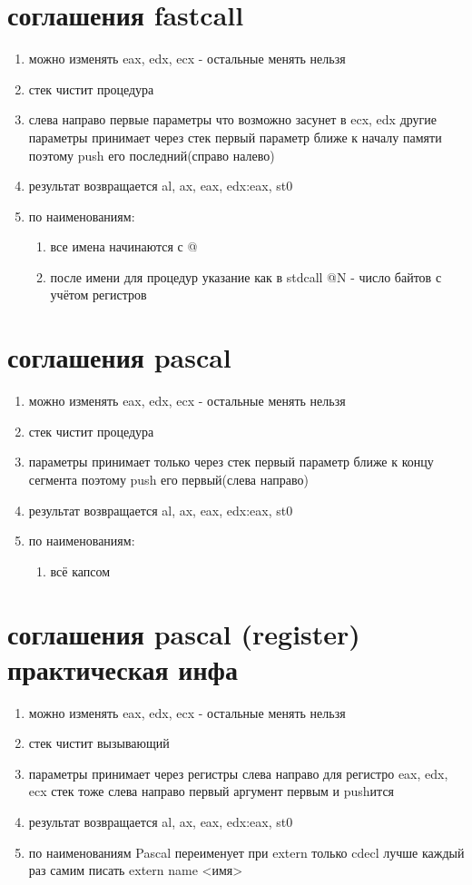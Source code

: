\documentclass[a4paper,10pt]{article}
\begin{document}
\section*{соглашения fastcall}
\begin{enumerate}
    \item можно изменять eax, edx, ecx - остальные менять нельзя
    \item стек чистит процедура
    \item слева направо первые параметры что возможно засунет в ecx, edx другие параметры принимает через стек первый параметр ближе к началу памяти поэтому push его последний(справо налево)
    \item результат возвращается al, ax, eax, edx:eax, st0
    \item по наименованиям:
    \begin{enumerate}
        \item все имена начинаются с @
        \item после имени для процедур указание как в stdcall @N - число байтов с учётом регистров
    \end{enumerate}
\end{enumerate}
\section*{соглашения pascal}
\begin{enumerate}
    \item можно изменять eax, edx, ecx - остальные менять нельзя
    \item стек чистит процедура 
    \item параметры принимает только через стек первый параметр ближе к концу сегмента поэтому push его первый(слева направо)
    \item результат возвращается al, ax, eax, edx:eax, st0
    \item по наименованиям:
    \begin{enumerate}
        \item всё капсом
    \end{enumerate}
\end{enumerate}
\section*{соглашения pascal (register) практическая инфа}
\begin{enumerate}
    \item можно изменять eax, edx, ecx - остальные менять нельзя
    \item стек чистит вызывающий
    \item параметры принимает через регистры слева направо для регистро eax, edx, ecx стек тоже слева направо первый аргумент первым и pushится
    \item результат возвращается al, ax, eax, edx:eax, st0
    \item по наименованиям Pascal переименует при extern только cdecl лучше каждый раз самим писать extern name <имя>
\end{enumerate}
\end{document}
